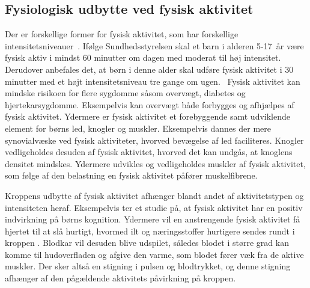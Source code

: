 \subsection{Fysiologisk udbytte ved fysisk aktivitet}\label{subsec:fysio_aktivitet}
Der er forskellige former for fysisk aktivitet, som har forskellige intensitetsniveauer~\citep{Academic2016a}. Ifølge Sundhedsstyrelsen skal et barn i alderen 5-17~år være fysisk aktiv i mindst 60 minutter om dagen med moderat til høj intensitet. Derudover anbefales det, at børn i denne alder skal udføre fysisk aktivitet i 30 minutter med et højt intensitetsniveau tre gange om ugen.~\citep{Sundhedsstyrelsen2016}\newline
Fysisk aktivitet kan mindske risikoen for flere sygdomme såsom overvægt, diabetes og hjertekarsygdomme. Eksempelvis kan overvægt både forbygges og afhjælpes af fysisk aktivitet. Ydermere er fysisk aktivitet et forebyggende samt udviklende element for børns led, knogler og muskler. Eksempelvis dannes der mere synovialvæske ved fysisk aktiviteter, hvorved bevægelse af led faciliteres. Knogler vedligeholdes desuden af fysisk aktivitet, hvorved det kan undgås, at knoglens densitet mindskes. Ydermere udvikles og vedligeholdes muskler af fysisk aktivitet, som følge af den belastning en fysisk aktivitet påfører muskelfibrene.~\citep{Smith1991,Academic2016b,CenterforDiseaseControlandPrevention2015}

Kroppens udbytte af fysisk aktivitet afhænger blandt andet af aktivitetstypen og intensiteten heraf. Eksempelvis ter et studie på, at fysisk aktivitet har en positiv indvirkning på børns kognition. \citep{SibleyEtnier2003} Ydermere vil en anstrengende fysisk aktivitet få hjertet til at slå hurtigt, hvormed ilt og næringsstoffer hurtigere sendes rundt i kroppen \citep{Hjerteforeningen}. Blodkar vil desuden blive udspilet, således blodet i større grad kan komme til hudoverfladen og afgive den varme, som blodet fører væk fra de aktive muskler. Der sker altså en stigning i pulsen og blodtrykket, og denne stigning afhænger af den pågældende aktivitets påvirkning på kroppen. \citep{Martini2012,Stanfield2013,Berchtold2010}